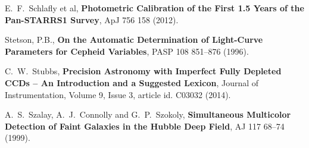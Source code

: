 \documentclass[12pt]{article}
\begin{document}
\begin{thebibliography}{10}
 E.~F.~Schlafly et al,
  \textbf{Photometric Calibration of the First 1.5 Years of the Pan-STARRS1 Survey},
  ApJ 756 158 (2012).

 Stetson, P.B.,
  \textbf{On the Automatic Determination of Light-Curve Parameters for Cepheid Variables},
  PASP 108 851--876 (1996).

 C.~W.~Stubbs,
  \textbf{Precision Astronomy with Imperfect Fully Depleted CCDs -- An Introduction and a Suggested Lexicon},
  Journal of Instrumentation, Volume 9, Issue 3, article id. C03032 (2014).

 A.~S.~Szalay, A.~J.~Connolly and G.~P.~Szokoly,
  \textbf{Simultaneous Multicolor Detection of Faint Galaxies in the Hubble Deep Field},
  AJ 117 68--74 (1999).

\end{thebibliography}
\end{document}
